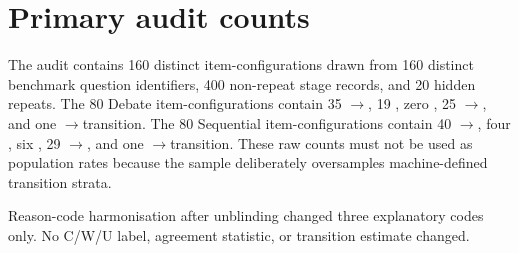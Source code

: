 \section{Primary audit counts}

The audit contains 160 distinct item-configurations drawn from 160 distinct benchmark question identifiers, 400 non-repeat stage records, and 20 hidden repeats. The 80 Debate item-configurations contain 35 \correct$\rightarrow$\correct, 19 \ctow, zero \wtoc, 25 \wrong$\rightarrow$\wrong, and one \uncertain$\rightarrow$\wrong transition. The 80 Sequential item-configurations contain 40 \correct$\rightarrow$\correct, four \ctow, six \wtoc, 29 \wrong$\rightarrow$\wrong, and one \uncertain$\rightarrow$\wrong transition. These raw counts must not be used as population rates because the sample deliberately oversamples machine-defined transition strata.

Reason-code harmonisation after unblinding changed three explanatory codes only. No C/W/U label, agreement statistic, or transition estimate changed.
